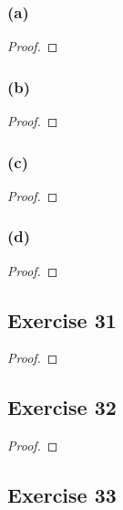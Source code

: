 \documentclass[14pt]{extarticle}
\begin{document}
\subsubsection{(a)}

\begin{proof}

\end{proof}

\subsubsection{(b)}

\begin{proof}

\end{proof}

\subsubsection{(c)}

\begin{proof}

\end{proof}

\subsubsection{(d)}

\begin{proof}

\end{proof}

\subsection{Exercise 31}

\begin{proof}

\end{proof}

\subsection{Exercise 32}

\begin{proof}

\end{proof}

\subsection{Exercise 33}
\end{document}
